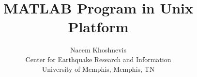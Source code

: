 \documentclass[12pt,a4paper,titlepage]{article}
\begin{document}
\title{{MATLAB\textsuperscript{\textregistered} Program in Unix Platform}}
\author{Naeem Khoshnevis\\
Center for Earthquake Research and Information \\
University of Memphis, Memphis, TN
}
\maketitle


\end{document}
